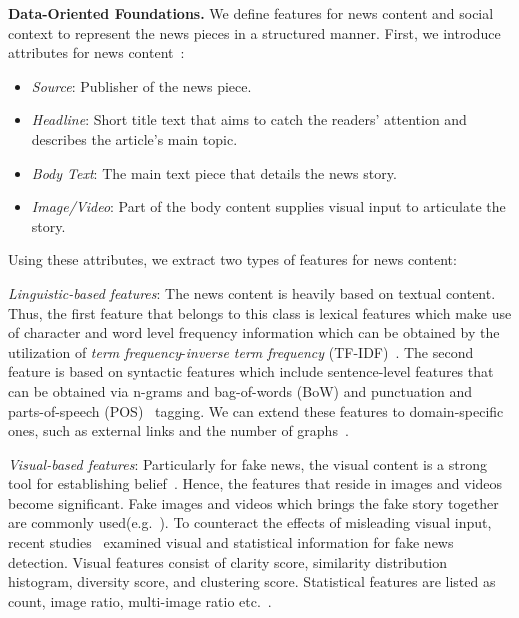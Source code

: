 \textbf{Data-Oriented Foundations.} We define features for news content and social context to represent the news pieces in a structured manner. First, we introduce attributes for news content~\parencite{FakeNewsDetectionOnSocialMediaADataMiningPerspective_Shu}:
\begin{itemize}
    \item \emph{Source}: Publisher of the news piece.
    \item \emph{Headline}: Short title text that aims to catch the readers’ attention and describes the article's main topic.
    \item \emph{Body Text}: The main text piece that details the news story.
    \item \emph{Image/Video}: Part of the body content supplies visual input to articulate the story.
\end{itemize}
Using these attributes, we extract two types of features for news content:
\begin{description}
    \item{\emph{Linguistic-based features}:} The news content is heavily based on textual content. Thus, the first feature that belongs to this class is lexical features which make use of character and word level frequency information which can be obtained by the utilization of
    \emph{term frequency}-\emph{inverse term frequency} (TF-IDF)~\parencite{TF_Luhn, IDF_Jones}. The second feature is based on syntactic features which include sentence-level features that can be obtained via n-grams and bag-of-words (BoW) and punctuation and parts-of-speech (POS)~\parencite{POS_Daelemans} tagging. We can extend these features to domain-specific ones, such as external links and the number of graphs~\parencite{AStylometricInquiry_Potthast}.
    \item{\emph{Visual-based features}:} Particularly for fake news, the visual content is a strong tool for establishing
    belief~\parencite{VisualMisAndDisinformation_Viorela}. Hence, the features that reside in images and videos become significant. Fake images
    and videos which brings the fake story together are commonly used(e.g.~\cite{PutinBehindBars_Harding, DeepFakeQueensSpeech_Sawer}). To counteract the effects of misleading visual input, recent studies~\parencite{ExploitingMultiDomainVisualInformation_Qi} examined visual and statistical information for fake news detection. Visual features consist of clarity score, similarity distribution histogram, diversity score, and clustering score. Statistical features are listed
    as count, image ratio, multi-image ratio etc.~\parencite{FakeNewsDetectionOnSocialMediaADataMiningPerspective_Shu}.
\end{description}


